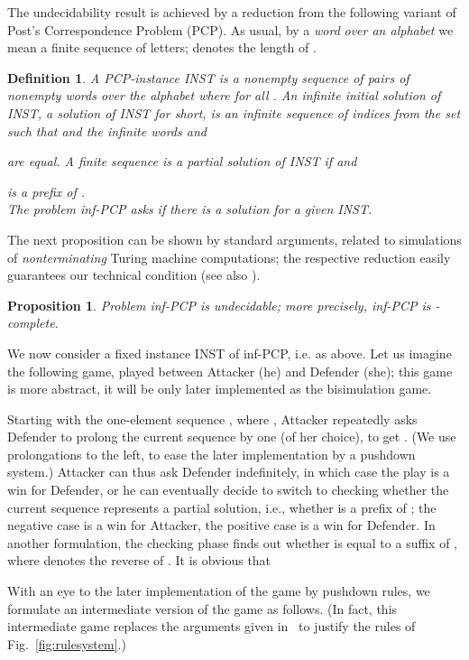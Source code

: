 \documentclass[11pt]{article}
\newtheorem{proposition}[theorem]{Proposition}
\newtheorem{definition}[theorem]{Definition}
\begin{document}
The undecidability result is 
achieved by a reduction from the following variant of
Post's Correspondence Problem (PCP). 
As usual, by a \emph{word}  \emph{over an alphabet} we
mean a finite sequence of letters;  denotes the length of .

\begin{definition}
A \emph{PCP-instance} INST
is a nonempty sequence
 of pairs of nonempty words
over the alphabet  where
 for all .
An \emph{infinite initial solution} of INST, a \emph{solution} of INST for short,
is an infinite sequence of
indices  from the set 
such that  and the infinite words
 and

are equal. A finite sequence  is a
\emph{partial solution} of INST if  and

is a prefix of .
\\
The problem \emph{inf-PCP} asks if there is 
a solution
for a given INST.
\end{definition}

The next proposition can be shown by standard arguments, related to
simulations of \emph{nonterminating} Turing machine computations;
the respective reduction easily guarantees our 
technical condition  
(see also \cite{DBLP:journals/jacm/JancarS08}). 


\begin{proposition}
\label{prop:infandrecPCP}
Problem inf-PCP is undecidable; more precisely, 
inf-PCP is -complete.
\end{proposition}

We now consider
a fixed instance INST of inf-PCP,
i.e. 
as above.
Let us imagine the following game, played between Attacker (he)
and  Defender (she); this game is more abstract, it will be only later
implemented as the bisimulation game.

Starting with the one-element sequence
, where , Attacker repeatedly asks Defender to prolong 
the current sequence 
 by one
 (of her choice),
to get . 
(We use prolongations to the left, to ease the later implementation by
a pushdown system.)
Attacker can thus ask Defender indefinitely, 
in which case the play is
a win for Defender, or he can
eventually decide to
switch to checking whether the current sequence
represents a partial solution, i.e., 
whether  is a prefix of
; the negative case is a win for
Attacker, the positive case is a win for Defender. 
In another formulation, 
the checking phase finds out
whether
  is equal to 
 a suffix
of 
 , where 
  denotes the reverse of .
It is obvious that 


With an eye to the later implementation of the game by pushdown rules,
we formulate an intermediate version of the game as follows.
(In fact, this intermediate game replaces the arguments 
given in~\cite{DBLP:journals/jacm/JancarS08} to justify
the rules of Fig.~\ref{fig:rulesystem}.)
\end{document}
